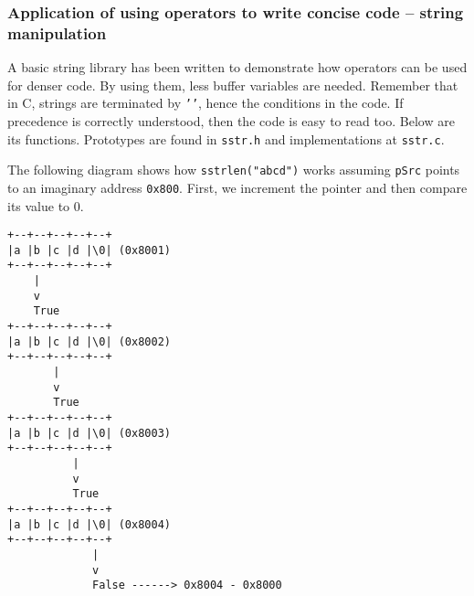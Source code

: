 \documentclass[a4paper]{article}
\begin{document}
\subsubsection{Application of using operators to write concise code -- string manipulation}

A basic string library has been written to demonstrate how operators can be used for denser code. By using them, less buffer variables are needed. Remember that in C, strings are terminated by \texttt{''}, hence the conditions in the code. If precedence is correctly understood, then the code is easy to read too. Below are its functions. Prototypes are found in \texttt{sstr.h} and implementations at \texttt{sstr.c}.


The following diagram shows how \texttt{sstrlen("abcd")} works assuming \texttt{pSrc} points to an imaginary address \texttt{0x800}. First, we increment the pointer and then compare its value to 0.
\begin{verbatim}
+--+--+--+--+--+
|a |b |c |d |\0| (0x8001)
+--+--+--+--+--+
    |
    v
    True     
+--+--+--+--+--+
|a |b |c |d |\0| (0x8002)
+--+--+--+--+--+
       | 
       v
       True     
+--+--+--+--+--+
|a |b |c |d |\0| (0x8003)
+--+--+--+--+--+
          | 
          v
          True
+--+--+--+--+--+
|a |b |c |d |\0| (0x8004)
+--+--+--+--+--+
             |
             v
             False ------> 0x8004 - 0x8000
\end{verbatim}










\end{document}

